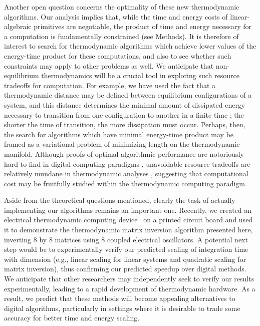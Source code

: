 \documentclass[prx,onecolumn,floatfix,longbibliography,notitlepage, nofootinbib,12pt]{revtex4-2}
\begin{document}
Another open question concerns the optimality of these new thermodynamic algorithms. Our analysis implies that, while the time and energy costs of linear-algebraic primitives are negotiable, the product of time and energy necessary for a computation is fundamentally constrained (see Methods). It is therefore of interest to search for thermodynamic algorithms which achieve lower values of the energy-time product for these computations, and also to see whether such constraints may apply to other problems as well. We anticipate that non-equilibrium thermodynamics will be a crucial tool in exploring such resource tradeoffs for computation. For example, we have used the fact that a thermodynamic distance may be defined between equilibrium configurations of a system, and this distance determines the minimal amount of dissipated energy necessary to transition from one configuration to another in a finite time \cite{crooks2007measuring, cafaro2022thermodynamic, quevedo2007geometrothermodynamics,andresen1996finite,chen2021extrapolating}; the shorter the time of transition, the more dissipation must occur. Perhaps, then, the search for algorithms which have minimal energy-time product may be framed as a variational problem of minimizing length on the thermodynamic manifold. Although proofs of optimal algorithmic performance are notoriously hard to find in digital computing paradigms \cite{saptharishi2015survey}, unavoidable resource tradeoffs are  relatively mundane in thermodynamic analyses \cite{chiribella2022nonequilibrium, riechers2018transforming}, suggesting that computational cost may be fruitfully studied within the thermodynamic computing paradigm.


Aside from the theoretical questions mentioned, clearly the task of actually implementing our algorithms remains an important one. Recently, we created an electrical thermodynamic computing device~\cite{melanson2023thermodynamic} on a printed circuit board and used it to demonstrate the thermodynamic matrix inversion algorithm presented here, inverting 8 by 8 matrices using 8 coupled electrical oscillators. A potential next step would be to experimentally verify our predicted scaling of integration time with dimension (e.g., linear scaling for linear systems and quadratic scaling for matrix inversion), thus confirming our predicted speedup over digital methods. We anticipate that other researchers may independently seek to verify our results experimentally, leading to a rapid development of thermodynamic hardware. As a result, we predict that these methods will become appealing alternatives to digital algorithms, particularly in settings where it is desirable to trade some accuracy for better time and energy scaling.
\end{document}
